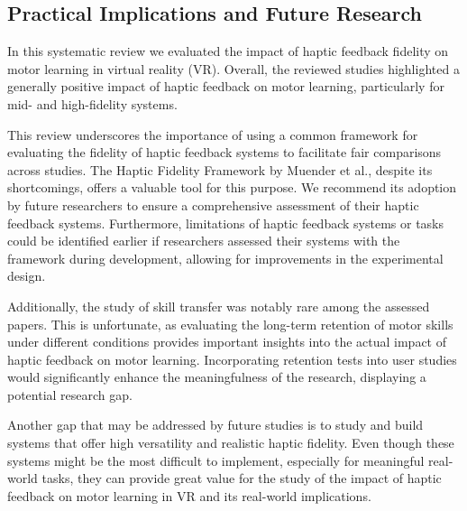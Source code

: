 \subsection{Practical Implications and Future Research}
In this systematic review we evaluated the impact of haptic feedback fidelity on motor learning in virtual reality (VR). Overall, the reviewed studies highlighted a generally positive impact of haptic feedback on motor learning, particularly for mid- and high-fidelity systems.

This review underscores the importance of using a common framework for evaluating the fidelity of haptic feedback systems to facilitate fair comparisons across studies. The Haptic Fidelity Framework by Muender et al., despite its shortcomings, offers a valuable tool for this purpose. We recommend its adoption by future researchers to ensure a comprehensive assessment of their haptic feedback systems. Furthermore, limitations of haptic feedback systems or tasks could be identified earlier if researchers assessed their systems with the framework during development, allowing for improvements in the experimental design.

Additionally, the study of skill transfer was notably rare among the assessed papers. This is unfortunate, as evaluating the long-term retention of motor skills under different conditions provides important insights into the actual impact of haptic feedback on motor learning. Incorporating retention tests into user studies would significantly enhance the meaningfulness of the research, displaying a potential research gap.

Another gap that may be addressed by future studies is to study and build systems that offer high versatility and realistic haptic fidelity. Even though these systems might be the most difficult to implement, especially for meaningful real-world tasks, they can provide great value for the study of the impact of haptic feedback on motor learning in VR and its real-world implications. 
